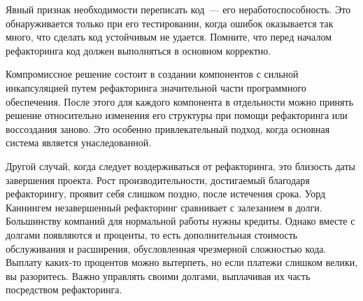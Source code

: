 \documentclass{../../text-style}
\begin{document}
Явный признак необходимости переписать код~--- его неработоспособность. Это обнаруживается только при его тестировании, когда ошибок оказывается так много, что сделать код устойчивым не удается. Помните, что перед началом рефакторинга код должен выполняться в основном корректно.

Компромиссное решение состоит в создании компонентов с сильной инкапсуляцией путем рефакторинга значительной части программного обеспечения. После этого для каждого компонента в отдельности можно принять решение относительно изменения его структуры при помощи рефакторинга или воссоздания заново. Это особенно привлекательный подход, когда основная система является унаследованной.

Другой случай, когда следует воздерживаться от рефакторинга, это близость даты завершения проекта. Рост производительности, достигаемый благодаря рефакторингу, проявит себя слишком поздно, после истечения срока. Уорд Каннингем незавершенный рефакторинг сравнивает с залезанием в долги. Большинству компаний для нормальной работы нужны кредиты. Однако вместе с долгами появляются и проценты, то есть дополнительная стоимость обслуживания и расширения, обусловленная чрезмерной сложностью кода. Выплату каких-то процентов можно вытерпеть, но если платежи слишком велики, вы разоритесь. Важно управлять своими долгами, выплачивая их часть посредством рефакторинга.
\end{document}
